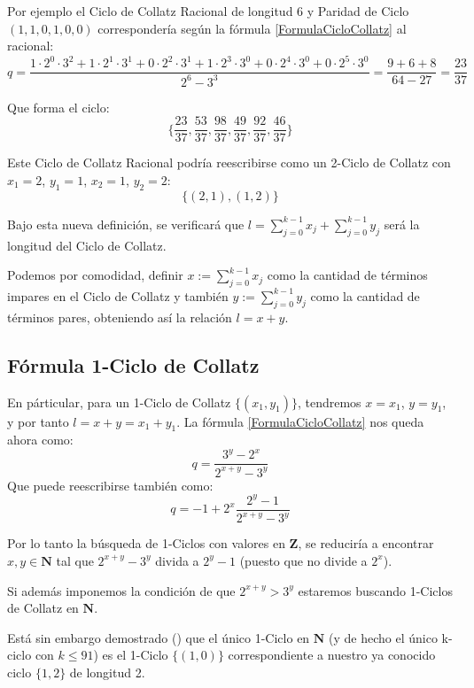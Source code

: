 Por ejemplo el Ciclo de Collatz Racional de longitud $6$ y Paridad de Ciclo $(1,1,0,1,0,0)$ correspondería según la fórmula \ref{FormulaCicloCollatz} al racional:
$$q = \frac{1\cdot2^0\cdot3^2 + 1\cdot2^1\cdot3^1 + 0\cdot2^2\cdot3^1 + 1\cdot2^3\cdot3^0 + 0\cdot2^4\cdot3^0 + 0\cdot2^5\cdot3^0}{2^6-3^3}=\frac{9+6+8}{64-27}=\frac{23}{37}$$



Que forma el ciclo:
$$\{ \frac{23}{37}, \frac{53}{37}, \frac{98}{37}, \frac{49}{37}, \frac{92}{37}, \frac{46}{37}\}$$

Este Ciclo de Collatz Racional podría reescribirse como un 2-Ciclo de Collatz con $x_1=2$, $y_1=1$, $x_2=1$, $y_2=2$:
$$\{(2,1),(1,2)\}$$

Bajo esta nueva definición, se verificará que $l=\sum\limits_{j=0}^{k-1} x_j + \sum\limits_{j=0}^{k-1}y_j$ será la longitud del Ciclo de Collatz.

Podemos por comodidad, definir $x:=\sum\limits_{j=0}^{k-1} x_j$ como la cantidad de términos impares en el Ciclo de Collatz y también $y:=\sum\limits_{j=0}^{k-1} y_j$ como la cantidad de términos pares, obteniendo así la relación $l=x+y$.



\subsection{Fórmula 1-Ciclo de Collatz}
En párticular, para un 1-Ciclo de Collatz $\{ (x_1, y_1) \}$, tendremos $x=x_1$, $y=y_1$, y por tanto $l=x+y=x_1+y_1$.
La fórmula \ref{FormulaCicloCollatz} nos queda ahora como:
\begin{equation}
    \label{Formula1CicloCollatz}
    q = \frac{3^y-2^x}{2^{x+y}-3^y}
\end{equation}
Que puede reescribirse también como:
\begin{equation}
    \label{Formula1CicloCollatzAlterna}
    q = -1 + 2^x\frac{2^y-1}{2^{x+y}-3^y}
\end{equation}

Por lo tanto la búsqueda de 1-Ciclos con valores en $\mathbf{Z}$, se reduciría a encontrar $x,y \in \mathbf{N}$ tal que $2^{x+y}-3^y$ divida a $2^y-1$ (puesto que no divide a $2^x$).

Si además imponemos la condición de que $2^{x+y}>3^y$ estaremos buscando 1-Ciclos de Collatz en $\mathbf{N}$.

Está sin embargo demostrado (\cite{LowerBoundsCycleLength}) que el único 1-Ciclo en $\mathbf{N}$ (y de hecho el único k-ciclo con $k\leq91$) es el 1-Ciclo $\{(1,0)\}$ correspondiente a nuestro ya conocido ciclo $\{1,2\}$ de longitud 2.

